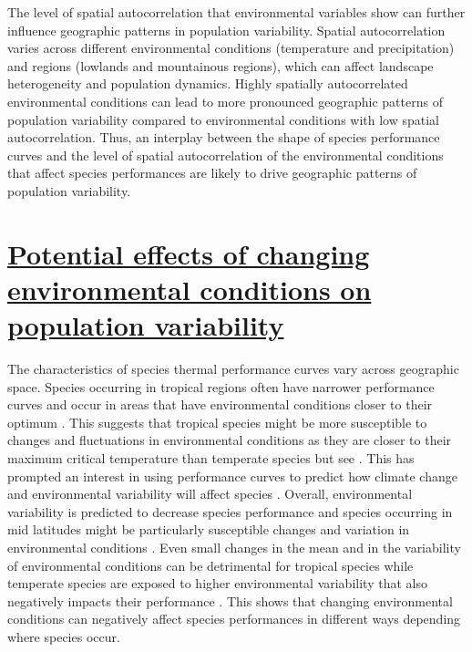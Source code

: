The level of spatial autocorrelation that environmental variables show can further influence geographic patterns in population variability. Spatial autocorrelation varies across different environmental conditions (temperature and precipitation) and regions (lowlands and mountainous regions), which can affect landscape heterogeneity and population dynamics. Highly spatially autocorrelated environmental conditions can lead to more pronounced geographic patterns of population variability compared to environmental conditions with low spatial autocorrelation. Thus, an interplay between the shape of species performance curves and the level of spatial autocorrelation of the environmental conditions that affect species performances are likely to drive geographic patterns of population variability.     


\section*{\textbf{\uline{Potential effects of changing environmental conditions on population variability}}}

The characteristics of species thermal performance curves vary across geographic space. Species occurring in tropical regions often have narrower performance curves and occur in areas that have environmental conditions closer to their optimum \parencite{kingsolver2017}. This suggests that tropical species might be more susceptible to changes and fluctuations in environmental conditions as they are closer to their maximum critical temperature than temperate species \parencite{deutsch2008, kingsolver2013, dowd2015} but see \parencite{vasseur2014}. This has prompted an interest in using performance curves to predict how climate change and environmental variability will affect species \parencite{sinclair2016, buckley2008, kingsolver2013, kingsolver2017, dowd2015}.  Overall, environmental variability is predicted to decrease species performance \parencite{dowd2015,kingsolver2017} and species occurring in mid latitudes might be particularly susceptible changes and variation in environmental conditions \parencite{kingsolver2013, buckley2022}. Even small changes in the mean and in the variability of environmental conditions can be detrimental for tropical species \parencite{dowd2015, kingsolver2017} while temperate species are exposed to higher environmental variability that also negatively impacts their performance \parencite{huey2012, kingsolver2013}. This shows that changing environmental conditions can negatively affect species performances in different ways depending where species occur. 

